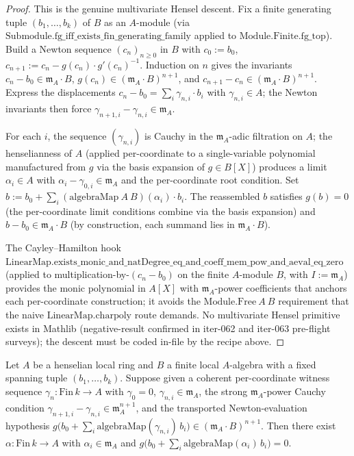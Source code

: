 \begin{proof}

\leanok
This is the genuine multivariate Hensel descent. Fix a finite
generating tuple $(b_1, \ldots, b_k)$ of $B$ as an $A$-module
(via $\mathrm{Submodule.fg\_iff\_exists\_fin\_generating\_family}$
applied to $\mathrm{Module.Finite.fg\_top}$). Build a Newton
sequence $(c_n)_{n \ge 0}$ in $B$ with $c_0 := b_0$,
$c_{n+1} := c_n - g(c_n) \cdot g'(c_n)^{-1}$. Induction on $n$
gives the invariants
$c_n - b_0 \in \mathfrak m_A \cdot B$,
$g(c_n) \in (\mathfrak m_A \cdot B)^{n+1}$, and
$c_{n+1} - c_n \in (\mathfrak m_A \cdot B)^{n+1}$. Express the
displacements $c_n - b_0 = \sum_i \gamma_{n,i} \cdot b_i$ with
$\gamma_{n,i} \in A$; the Newton invariants then force
$\gamma_{n+1,i} - \gamma_{n,i} \in \mathfrak m_A$.

For each $i$, the sequence $(\gamma_{n,i})$ is Cauchy in the
$\mathfrak m_A$-adic filtration on $A$; the henselianness of
$A$ (applied per-coordinate to a single-variable polynomial
manufactured from $g$ via the basis expansion of $g \in B[X]$)
produces a limit $\alpha_i \in A$ with
$\alpha_i - \gamma_{0,i} \in \mathfrak m_A$ and the per-coordinate
root condition. Set
$b := b_0 + \sum_i (\mathrm{algebraMap}\ A\ B)(\alpha_i) \cdot b_i$.
The reassembled $b$ satisfies $g(b) = 0$ (the per-coordinate
limit conditions combine via the basis expansion) and
$b - b_0 \in \mathfrak m_A \cdot B$ (by construction, each
summand lies in $\mathfrak m_A \cdot B$).

The Cayley--Hamilton hook
$\mathrm{LinearMap.exists\_monic\_and\_natDegree\_eq\_and\_coeff\_mem\_pow\_and\_aeval\_eq\_zero}$
(applied to multiplication-by-$(c_n - b_0)$ on the finite
$A$-module $B$, with $I := \mathfrak m_A$) provides the monic
polynomial in $A[X]$ with $\mathfrak m_A$-power coefficients
that anchors each per-coordinate construction; it avoids the
$\mathrm{Module.Free}\ A\ B$ requirement that the naive
$\mathrm{LinearMap.charpoly}$ route demands. No multivariate
Hensel primitive exists in Mathlib (negative-result confirmed
in iter-062 and iter-063 pre-flight surveys); the descent must
be coded in-file by the recipe above.
\end{proof}

\begin{lemma}
\label{lem:henselianPair-l3c-charpoly-hensel-root-from-coherent}
Let $A$ be a henselian local ring and $B$ a finite local
$A$-algebra with a fixed spanning tuple
$(b_1, \ldots, b_k)$. Suppose given a coherent per-coordinate
witness sequence $\gamma_n : \mathrm{Fin}\,k \to A$ with
$\gamma_0 = 0$, $\gamma_{n,i} \in \mathfrak m_A$, the strong
$\mathfrak m_A$-power Cauchy condition
$\gamma_{n+1,i} - \gamma_{n,i} \in \mathfrak m_A^{n+1}$, and
the transported Newton-evaluation hypothesis
$g\bigl(b_0 + \sum_i \mathrm{algebraMap}(\gamma_{n,i})\,b_i\bigr)
  \in (\mathfrak m_A \cdot B)^{n+1}$.
Then there exist $\alpha : \mathrm{Fin}\,k \to A$ with
$\alpha_i \in \mathfrak m_A$ and
$g\bigl(b_0 + \sum_i \mathrm{algebraMap}(\alpha_i)\,b_i\bigr) = 0$.
\end{lemma}

